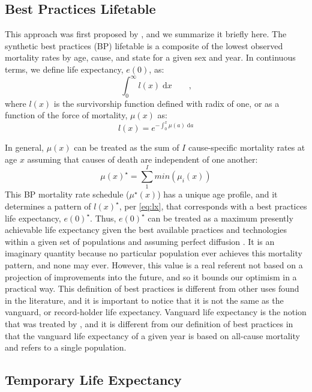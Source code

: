 \documentclass{article}
\newcommand{\dd}{\; \mathrm{d}}
\newcommand{\tc}{\quad\quad\text{,}}
\begin{document}
\subsection*{Best Practices Lifetable}
This approach was first proposed by \citet{whelpton1947}, and we summarize it
briefly here. The synthetic best practices (BP) lifetable is a composite of the
lowest observed mortality rates by age, cause, and state for a given sex and year. In continuous terms, we define life expectancy, $e(0)$, as:
\begin{equation}
\int _0 ^\infty l(x) \dd x \tc
\end{equation}
where $l(x)$ is the survivorship function defined with radix of one, or as a
function of the force of mortality, $\mu(x)$ as:
\begin{equation}
\label{eq:lx}
l(x) = e^{-\int_0^x \mu(a) \dd a}
\end{equation}

In general, $\mu(x)$ can be treated as the sum of $I$ cause-specific mortality
rates at age $x$ assuming that causes of death are independent of one another:
\begin{equation}
\label{eq:mxmin}
\mu(x)^{\star} = \sum_1^I min(\mu_i(x))
\end{equation}
This BP mortality rate schedule ($\mu^{\star}(x)$) has a unique
age profile, and it determines a pattern of $l(x)^{\star}$, per \eqref{eq:lx}, that corresponds with a
best practices life expectancy, $e(0)^{\star}$. Thus, $e(0)^{\star}$ can be treated as a
maximum presently achievable life expectancy given the best available
practices and technologies within a given set of populations and assuming
perfect diffusion \citep{vallin2008minimum}. It is an imaginary quantity because no particular population
ever achieves this mortality pattern, and none may ever. However, this value is
a real referent not based on a projection of improvements into the future, and
so it bounds our optimism in a practical way. This definition of best practices
is different from other uses found in the literature, and it is important to
notice that it is not the same as the vanguard, or record-holder life
expectancy. Vanguard life expectancy is the notion that was treated by
\citet{oeppen2002broken}, and it is different from our definition of best
practices in that the vanguard life expectancy of a given year is based on
all-cause mortality and refers to a single population.

\subsection*{Temporary Life Expectancy}
\end{document}
